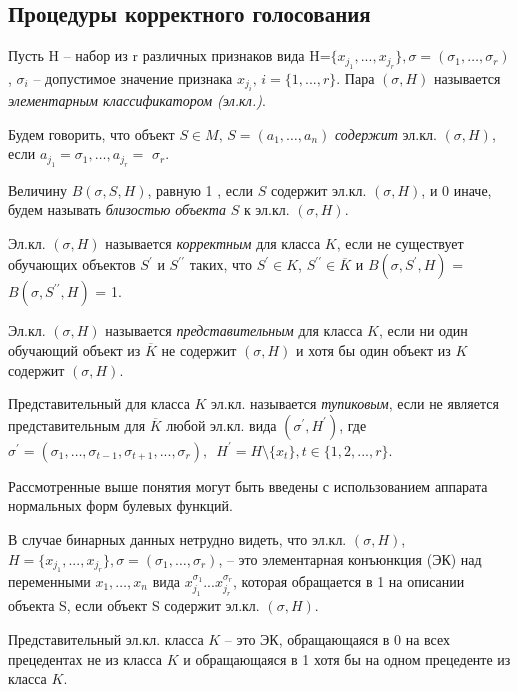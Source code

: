 \documentclass{article}
\begin{document}
\subsection{Процедуры корректного голосования}

Пусть H -- набор из r различных признаков вида H=$\{x_{j_1},...,x_{j_r}\}, \sigma=(\sigma_1,…,\sigma_r)$, $\sigma_i$ -- допустимое значение признака $x_{j_i}\text{, } i=\{1,...,r\}$. Пара $(\sigma,H)$ называется \textit{элементарным классификатором (эл.кл.)}.

Будем говорить, что объект $S \in M\text{, } S=\left(a_{1}, \ldots, a_{n}\right)$ \textit{содержит} эл.кл. $(\sigma, H)$, если $a_{j_{1}}=\sigma_{1}, \ldots, a_{j_{r}}=$ $\sigma_{r}$.

Величину $B(\sigma, S, H)$, равную 1 , если $S$ содержит эл.кл. $(\sigma, H)$, и 0 иначе, будем называть \textit{близостью объекта} $S$ к эл.кл. $(\sigma, H)$. 

Эл.кл. $(\sigma,H)$ называется \textit{корректным} для класса $K$, если не существует обучающих объектов $S^\prime$ и $S^{\prime\prime}$ таких, что $S^\prime \in K$, $S^{\prime\prime} \in \overline{K}$  и $B(\sigma, S^\prime, H)$ = $B(\sigma, S^{\prime\prime}, H)$ = 1.

Эл.кл. $(\sigma, H)$ называется \textit{представительным} для класса $K$, если ни один обучающий объект из $\overline{K}$ не содержит $(\sigma, H)$ и хотя бы один объект из $K$ содержит $(\sigma, H)$.

Представительный для класса $K$ эл.кл. называется \textit{тупиковым}, если не является представительным для $\overline{K}$ любой эл.кл. вида $(\sigma^\prime, H^\prime)$, где $\sigma^\prime=(\sigma_1,…,\sigma_{t-1},\sigma_{t+1},...,\sigma_r)\text{, }$ $H^\prime= H \setminus \{x_t\}, t \in \{1,2,...,r\}$.

Рассмотренные выше понятия могут быть введены с использованием аппарата нормальных форм булевых функций.

В случае бинарных данных нетрудно видеть, что эл.кл. $(\sigma, H)$, $H=\{x_{j_1},...,x_{j_r}\}, \sigma=(\sigma_1,…,\sigma_r)$, – это элементарная конъюнкция (ЭК) над переменными $x_1,…,x_n$ вида $x_{j_1}^{\sigma_1}...x_{j_r}^{\sigma_r}$, которая обращается в 1 на описании объекта S, если объект S содержит эл.кл. $(\sigma, H)$.

Представительный эл.кл. класса $K$ -- это ЭК, обращающаяся в 0 на всех прецедентах не из класса $K$ и обращающаяся в 1 хотя бы на одном прецеденте из класса $K$.
\end{document}
